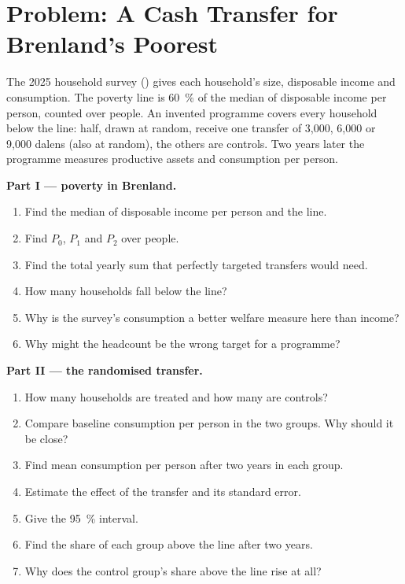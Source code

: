 \section{Problem: A Cash Transfer for Brenland's Poorest}\label{sec:b3:development-microeconomics:problem}

\begin{problem}\label{pb:b3:development-microeconomics:cash}
The 2025 household survey () gives each household's size, disposable
income and consumption. The poverty line is 60~\% of the median of disposable income per
person, counted over people. An invented programme covers every household below the
line: half, drawn at random, receive one transfer of 3{,}000, 6{,}000 or 9{,}000 dalens (also at random), the
others are controls. Two years later the programme measures productive assets and
consumption per person. %

\medskip\noindent\textbf{Part I --- poverty in Brenland.}
\begin{enumerate}
\item Find the median of disposable income per person and the line.
\item Find $P_0$, $P_1$ and $P_2$ over people.
\item Find the total yearly sum that perfectly targeted transfers would need.
\item How many households fall below the line?
\item Why is the survey's consumption a better welfare measure here than income?
\item Why might the headcount be the wrong target for a programme?
\end{enumerate}

\medskip\noindent\textbf{Part II --- the randomised transfer.}
\begin{enumerate}[resume]
\item How many households are treated and how many are controls?
\item Compare baseline consumption per person in the two groups. Why should it be close?
\item Find mean consumption per person after two years in each group.
\item Estimate the effect of the transfer and its standard error.
\item Give the 95~\% interval.
\item Find the share of each group above the line after two years.
\item Why does the control group's share above the line rise at all?
\end{enumerate}


\end{problem}

